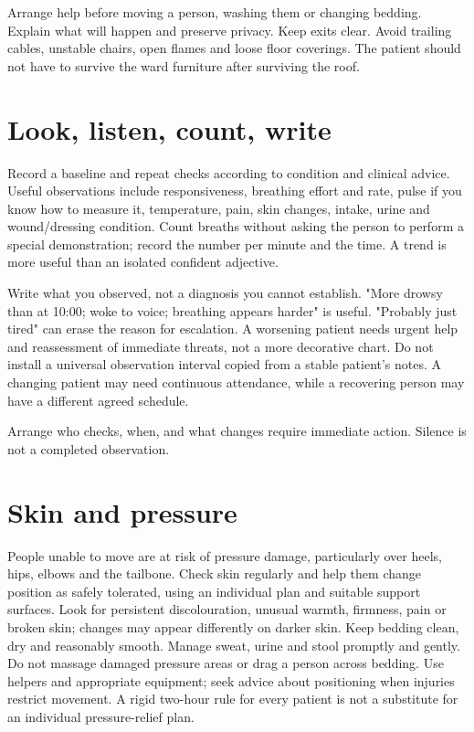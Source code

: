 \documentclass[10pt,openright]{book}
\begin{document}
Arrange help before moving a person, washing them or changing bedding. Explain what will happen and preserve privacy. Keep exits clear. Avoid trailing cables, unstable chairs, open flames and loose floor coverings. The patient should not have to survive the ward furniture after surviving the roof.

\section*{Look, listen, count, write}
Record a baseline and repeat checks according to condition and clinical advice. Useful observations include responsiveness, breathing effort and rate, pulse if you know how to measure it, temperature, pain, skin changes, intake, urine and wound/dressing condition. Count breaths without asking the person to perform a special demonstration; record the number per minute and the time. A trend is more useful than an isolated confident adjective.

Write what you observed, not a diagnosis you cannot establish. "More drowsy than at 10:00; woke to voice; breathing appears harder" is useful. "Probably just tired" can erase the reason for escalation. A worsening patient needs urgent help and reassessment of immediate threats, not a more decorative chart. Do not install a universal observation interval copied from a stable patient's notes. A changing patient may need continuous attendance, while a recovering person may have a different agreed schedule.

Arrange who checks, when, and what changes require immediate action. Silence is not a completed observation.

\section*{Skin and pressure}
People unable to move are at risk of pressure damage, particularly over heels, hips, elbows and the tailbone. Check skin regularly and help them change position as safely tolerated, using an individual plan and suitable support surfaces. Look for persistent discolouration, unusual warmth, firmness, pain or broken skin; changes may appear differently on darker skin. Keep bedding clean, dry and reasonably smooth. Manage sweat, urine and stool promptly and gently. Do not massage damaged pressure areas or drag a person across bedding. Use helpers and appropriate equipment; seek advice about positioning when injuries restrict movement. A rigid two-hour rule for every patient is not a substitute for an individual pressure-relief plan.
\end{document}
